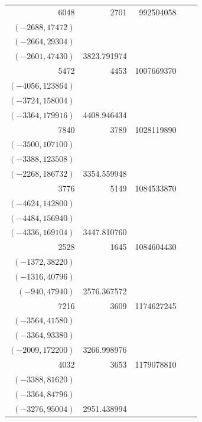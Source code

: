 \documentclass[11pt]{article}
\begin{document}
\begin{longtable}{r r r l r}
6048 & 2701 & 992504058 & \begin{tabular}[t]{@{}l@{}}$(-2700,4860)$\\$(-2688,17472)$\\$(-2664,29304)$\\$(-2601,47430)$\end{tabular} & 3823.791974\\[5pt]
5472 & 4453 & 1007669370 & \begin{tabular}[t]{@{}l@{}}$(-4161,108186)$\\$(-4056,123864)$\\$(-3724,158004)$\\$(-3364,179916)$\end{tabular} & 4408.946434\\[5pt]
7840 & 3789 & 1028119890 & \begin{tabular}[t]{@{}l@{}}$(-3528,102312)$\\$(-3500,107100)$\\$(-3388,123508)$\\$(-2268,186732)$\end{tabular} & 3354.559948\\[5pt]
3776 & 5149 & 1084533870 & \begin{tabular}[t]{@{}l@{}}$(-4864,109440)$\\$(-4624,142800)$\\$(-4484,156940)$\\$(-4336,169104)$\end{tabular} & 3447.810760\\[5pt]
2528 & 1645 & 1084604430 & \begin{tabular}[t]{@{}l@{}}$(-1580,20540)$\\$(-1372,38220)$\\$(-1316,40796)$\\$(-940,47940)$\end{tabular} & 2576.367572\\[5pt]
7216 & 3609 & 1174627245 & \begin{tabular}[t]{@{}l@{}}$(-3600,18720)$\\$(-3564,41580)$\\$(-3364,93380)$\\$(-2009,172200)$\end{tabular} & 3266.998976\\[5pt]
4032 & 3653 & 1179078810 & \begin{tabular}[t]{@{}l@{}}$(-3600,38160)$\\$(-3388,81620)$\\$(-3364,84796)$\\$(-3276,95004)$\end{tabular} & 2951.438994\\[5pt]

\end{longtable}
\end{document}
